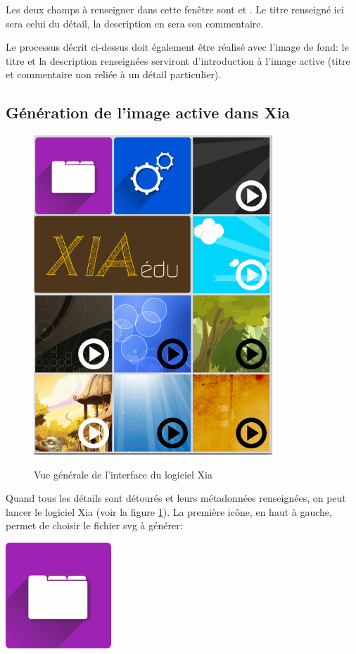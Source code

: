 {Les deux champs à renseigner dans cette fenêtre sont  et .
Le titre renseigné ici sera celui du détail, la description en sera son commentaire.

Le processus décrit ci-dessus doit également être réalisé avec l'image de fond: le titre et la description renseignées
serviront d'introduction à l'image active (titre et commentaire non reliée à un détail particulier).

\subsection{Génération de l'image active dans Xia}

\begin{figure}[htp]
 \centering
 \caption{Vue générale de l'interface du logiciel Xia}
 \includegraphics[width=0.8\textwidth]{./images/xia_vue_generale}
 \label{xia_interface}
\end{figure}

Quand tous les détails sont détourés et leurs métadonnées renseignées, on peut lancer le logiciel Xia (voir la figure \ref{xia_interface}).
La première icône, en haut à gauche, permet de choisir le fichier svg à générer:
\begin{center}
\includegraphics[scale=0.4]{./images/xia_open} 
\end{center}

}
